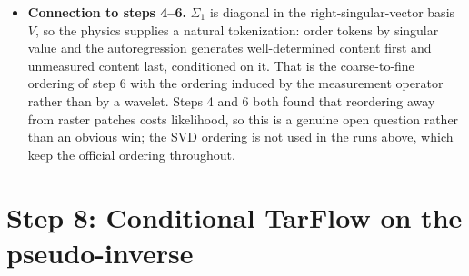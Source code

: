 \documentclass[11pt]{article}
\begin{document}
\begin{itemize}
        was trained on. SDB reports robustness under system misspecification;
        the flow bridge as built here has no mechanism for that, since $A$
        enters only through a fixed base density. Conditioning $f$ on $A$ (or
        on $A^{+}y$ as an auxiliary input) is required before any
        generalisation claim.
  \item \textbf{Connection to steps 4--6.} $\Sigma_1$ is diagonal in the
        right-singular-vector basis $V$, so the physics supplies a natural
        tokenization: order tokens by singular value and the autoregression
        generates well-determined content first and unmeasured content last,
        conditioned on it. That is the coarse-to-fine ordering of step 6 with
        the ordering induced by the measurement operator rather than by a
        wavelet. Steps 4 and 6 both found that reordering away from raster
        patches costs likelihood, so this is a genuine open question rather
        than an obvious win; the SVD ordering is not used in the runs above,
        which keep the official ordering throughout.
\end{itemize}

\section{Step 8: Conditional TarFlow on the pseudo-inverse}
\label{sec:step8}
\end{document}
